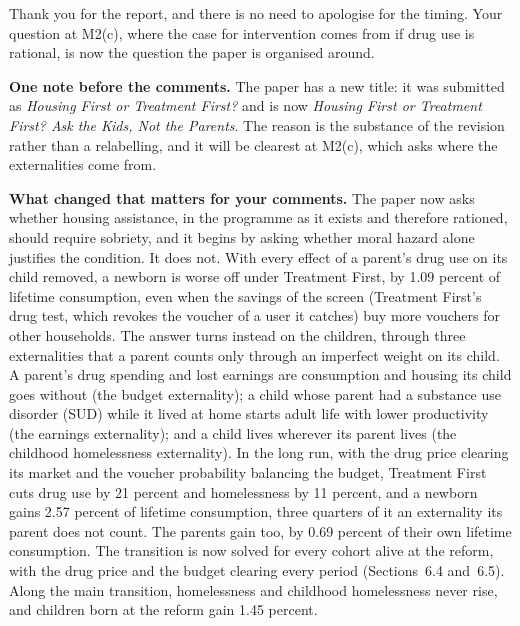 \documentclass[11pt]{article}
\begin{document}

Thank you for the report, and there is no need to apologise for the timing. Your
question at M2(c), where the case for intervention comes from if drug use is
rational, is now the question the paper is organised around.


{\color{respred}
\textbf{One note before the comments.} The paper has a new title: it was submitted as
\emph{Housing First or Treatment First?} and is now \emph{Housing First or Treatment First? Ask the Kids, Not the Parents}. The reason is the substance of the revision rather than a relabelling, and it
will be clearest at M2(c), which asks where the externalities come from.

\textbf{What changed that matters for your comments.} The paper now asks whether
housing assistance, in the programme as it exists and therefore rationed, should
require sobriety, and it begins by asking whether moral hazard alone justifies the
condition. It does not. With every effect of a parent's drug use on its child
removed, a newborn is worse off under Treatment First, by 1.09 percent of lifetime
consumption, even when the savings of the screen (Treatment First's drug test, which
revokes the voucher of a user it catches) buy more vouchers for other households.
The answer turns instead on the children, through three externalities that a parent
counts only through an imperfect weight on its child. A parent's drug spending and
lost earnings are consumption and housing its child goes without (the budget
externality); a child whose parent had a substance use disorder (SUD) while it lived
at home starts adult life with lower productivity (the earnings externality); and a
child lives wherever its parent lives (the childhood homelessness externality). In
the long run, with the drug price clearing its market and the voucher probability
balancing the budget, Treatment First cuts drug use by 21 percent and homelessness by
11 percent, and a newborn gains 2.57 percent of lifetime consumption, three quarters of
it an externality its parent does not count. The parents gain too, by 0.69 percent of
their own lifetime consumption. The transition is now solved for every cohort alive at
the reform, with the drug price and the budget clearing every period (Sections~6.4
and~6.5). Along the main transition, homelessness and childhood homelessness never
rise, and children born at the reform gain 1.45 percent.

}
\end{document}
